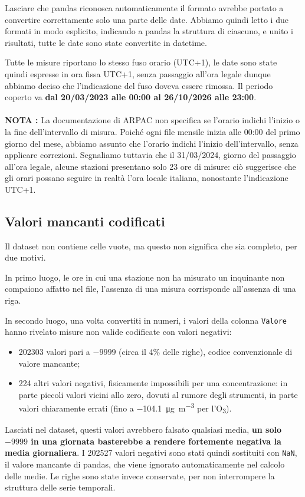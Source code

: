 \documentclass[11pt]{report}
\begin{document}
Lasciare che pandas riconosca automaticamente il formato avrebbe portato a
convertire correttamente solo una parte delle date. Abbiamo quindi letto i due
formati in modo esplicito, indicando a pandas la struttura di ciascuno, e unito
i risultati, tutte le date sono state convertite in datetime.

Tutte le misure riportano lo stesso fuso orario (UTC+1), le date sono state quindi
espresse in ora fissa UTC+1, senza passaggio all'ora legale dunque abbiamo deciso che l'indicazione
del fuso doveva essere rimossa. Il periodo coperto va \textbf{dal 20/03/2023 alle 00:00 al
26/10/2026 alle 23:00}.

\paragraph{}
\textbf{NOTA :} La documentazione di ARPAC non specifica se l'orario indichi l'inizio o la fine
dell'intervallo di misura. Poiché ogni file mensile inizia alle 00:00 del primo
giorno del mese, abbiamo assunto che l'orario indichi l'inizio dell'intervallo,
senza applicare correzioni. Segnaliamo tuttavia che il 31/03/2024, giorno del
passaggio all'ora legale, alcune stazioni presentano solo 23 ore di misure: ciò
suggerisce che gli orari possano seguire in realtà l'ora locale italiana,
nonostante l'indicazione UTC+1.

\subsection{Valori mancanti codificati}
Il dataset non contiene celle vuote, ma questo non significa che sia completo,
per due motivi.

In primo luogo, le ore in cui una stazione non ha misurato un
inquinante non compaiono affatto nel file, l'assenza di una misura corrisponde
all'assenza di una riga. 

In secondo luogo, una volta convertiti in numeri, i
valori della colonna \texttt{Valore} hanno rivelato misure non valide
codificate con valori negativi:
\begin{itemize}
  \item \num{202303} valori pari a $-9999$ (circa il 4\% delle righe), codice
        convenzionale di valore mancante;
  \item 224 altri valori negativi, fisicamente impossibili per una
        concentrazione: in parte piccoli valori vicini allo zero, dovuti al
        rumore degli strumenti, in parte valori chiaramente errati (fino a
        \SI{-104,1}{\micro\gram\per\cubic\metre} per l'O\textsubscript{3}).
\end{itemize}
Lasciati nel dataset, questi valori avrebbero falsato qualsiasi media,\textbf{ un solo
$-9999$ in una giornata basterebbe a rendere fortemente negativa la media
giornaliera}. I \num{202527} valori negativi sono stati quindi sostituiti con
\texttt{NaN}, il valore mancante di pandas, che viene ignorato automaticamente
nel calcolo delle medie. Le righe sono state invece conservate, per non
interrompere la struttura delle serie temporali.
\end{document}

